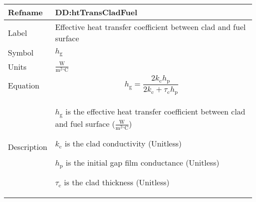 \documentclass[12pt]{article}
\begin{document}
\vspace{\baselineskip}
\noindent
\begin{minipage}{\textwidth}
\begin{tabular}{>{\raggedright}p{}>{\raggedright\arraybackslash}p{}}
\toprule \textbf{Refname} & \textbf{DD:htTransCladFuel}
\label{DD:htTransCladFuel}
\\ \midrule
Label & Effective heat transfer coefficient between clad and fuel surface
        
\\ \midrule
Symbol & ${h_{\text{g}}}$
         
\\ \midrule
Units & $\frac{\text{W}}{\text{m}^{2}{}^{\circ}\text{C}}$
        
\\ \midrule
Equation & \begin{displaymath}
           {h_{\text{g}}}=\frac{2 {k_{\text{c}}} {h_{\text{p}}}}{2 {k_{\text{c}}}+{τ_{\text{c}}} {h_{\text{p}}}}
           \end{displaymath}
\\ \midrule
Description & \begin{symbDescription}
              \item{${h_{\text{g}}}$ is the effective heat transfer coefficient between clad and fuel surface ($\frac{\text{W}}{\text{m}^{2}{}^{\circ}\text{C}}$)}
              \item{${k_{\text{c}}}$ is the clad conductivity (Unitless)}
              \item{${h_{\text{p}}}$ is the initial gap film conductance (Unitless)}
              \item{${τ_{\text{c}}}$ is the clad thickness (Unitless)}
              \end{symbDescription}
\\ \bottomrule
\end{tabular}
\end{minipage}
\vspace{\baselineskip}
\noindent
\end{document}
